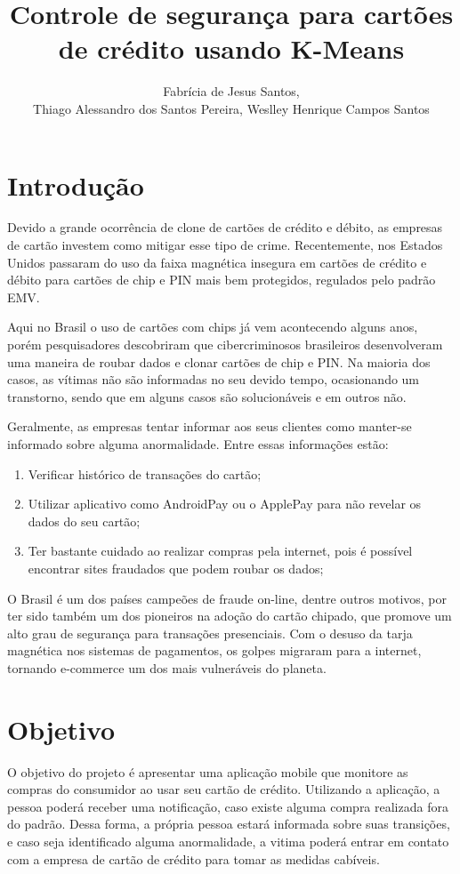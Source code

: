 \documentclass[12pt]{article}
\title{Controle de segurança para cartões de crédito usando K-Means}
\author{Fabrícia de Jesus Santos\inst{1}, \\ Thiago Alessandro dos Santos Pereira\inst{1}, Weslley Henrique Campos Santos\inst{1}}
\begin{document}
 

\maketitle

\section{Introdução}
Devido a grande ocorrência de clone de cartões de crédito e débito, as empresas de cartão investem como mitigar esse tipo de crime. Recentemente, nos Estados Unidos passaram do uso da faixa magnética insegura em cartões de crédito e débito para cartões de chip e PIN mais bem protegidos, regulados pelo padrão EMV.

Aqui no Brasil o uso de cartões com chips já vem acontecendo alguns anos, porém pesquisadores descobriram que cibercriminosos brasileiros desenvolveram uma maneira de roubar dados e clonar cartões de chip e PIN. Na maioria dos casos, as vítimas não são informadas no seu devido tempo, ocasionando um transtorno, sendo que em alguns casos são solucionáveis e em outros não.

Geralmente, as empresas tentar informar aos seus clientes como manter-se informado sobre alguma anormalidade. Entre essas informações estão:
\begin{enumerate}
	\item Verificar histórico de transações do cartão;
	\item Utilizar aplicativo como AndroidPay ou o ApplePay para não revelar os dados do seu cartão;
	\item Ter bastante cuidado ao realizar compras pela internet, pois é possível encontrar sites fraudados que podem roubar os dados;
\end{enumerate}

O Brasil é um dos países campeões de fraude on-line, dentre outros motivos, por ter sido também um dos pioneiros na adoção do cartão chipado, que promove um alto grau de segurança para transações presenciais. Com o desuso da tarja magnética nos sistemas de pagamentos, os golpes migraram para a internet, tornando e-commerce um dos mais vulneráveis do planeta.
\section{Objetivo}
O objetivo do projeto é apresentar uma aplicação mobile que monitore as compras do consumidor ao usar seu cartão de crédito. Utilizando a aplicação, a pessoa poderá receber uma notificação, caso existe alguma compra realizada fora do padrão. Dessa forma, a própria pessoa estará informada sobre suas transições, e caso seja identificado alguma anormalidade, a vitima poderá entrar em contato com a empresa de cartão de crédito para tomar as medidas cabíveis.
\end{document}
